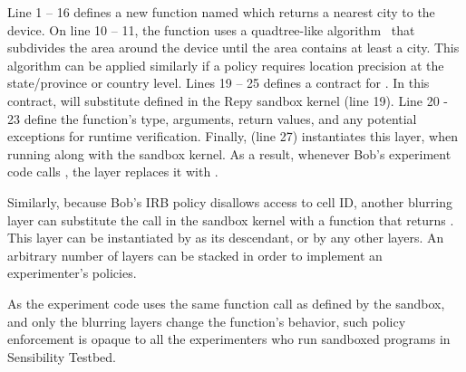 Line 1 -- 16 defines a new function named  which returns 
a nearest city to the device. On line 10 -- 11, the function 
uses a quadtree-like algorithm~\cite{gruteser2003anonymous} that subdivides 
the area around the device until the area contains at least a city.
This algorithm can be applied similarly if a policy requires location 
precision at the state/province or country level.
Lines 19 -- 25 defines a contract for . 
In this contract, 
 will substitute  defined 
in the Repy sandbox kernel (line 19).
Line 20 - 23 define the function's type, arguments,
return values, and any potential exceptions for runtime verification. 
Finally,  (line 27) instantiates this
 layer, when running along with the sandbox kernel. 
As a result, 
whenever Bob's experiment code calls , 
the  layer replaces it with . 

Similarly, because Bob's IRB policy disallows access to cell ID, another blurring layer 
can substitute the  call in the sandbox kernel with a function that
returns . This layer can be instantiated by 
as its descendant, or by any other layers. An arbitrary number of layers can 
be stacked in order to implement an experimenter's policies.

As the experiment code uses the same function call as defined by the sandbox, 
and only the blurring layers change the function's behavior, 
such policy enforcement is opaque to all the experimenters who run 
sandboxed programs in Sensibility Testbed.

